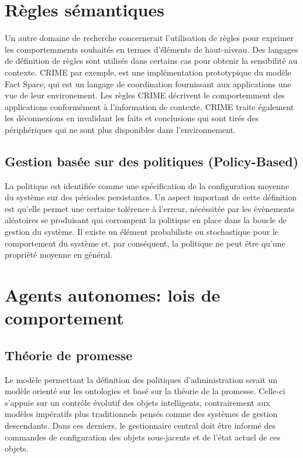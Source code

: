 \section{Règles sémantiques}

Un autre domaine de recherche concernerait l'utilisation de règles pour exprimer
les comportemments souhaités en termes d'éléments de haut-niveau. Des langages
de définition de règles sont utilisés dans certains cas pour obtenir la
sensibilité au contexte. CRIME \cite{murphy_coordination_2007} par exemple, est
une implémentation prototypique du modèle Fact Space, qui est un langage de
coordination fournissant aux applications une vue de leur environement. Les
règles CRIME décrivent le comportemment des applications conformément à
l'information de contexte. CRIME traite également les déconnexions en invalidant
les faits et conclusions qui sont tirés des périphériques qui ne sont plus
disponibles dans l'environnement.

\subsection{Gestion basée sur des politiques (Policy-Based)}

La politique est identifiée comme une spécification de la configuration moyenne
du système sur des périodes persistantes. Un aspect important de cette
définition est qu'elle permet une certaine tolérence à l'erreur, nécéssitée par
les évènements aléatoires se produisant qui corrompent la politique en place
dans la boucle de gestion du système. Il existe un élément probabiliste ou
stochastique pour le comportement du système et, par conséquent, la politique ne
peut être qu'une propriété moyenne en général.

\section{Agents autonomes: lois de comportement}

\subsection{Théorie de promesse}

Le modèle permettant la définition des politiques d'administration serait un
modèle orienté sur les ontologies et basé sur la théorie de la promesse.
Celle-ci s'appuie sur un contrôle évolutif des objets intelligents,
contrairement aux modèles impératifs plus traditionnels pensés comme des
systèmes de gestion descendants.  Dans ces derniers, le gestionnaire central
doit être informé des commandes de configuration des objets sous-jacents et de
l'état actuel de ces objets.

